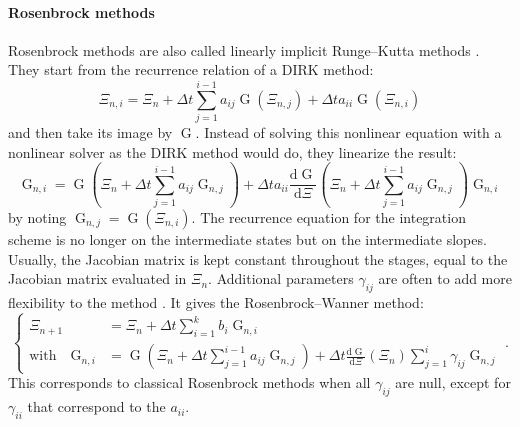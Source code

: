         \paragraph{Rosenbrock methods}
        Rosenbrock methods are also called linearly implicit Runge--Kutta methods \cite{Rosenbrock1963}.
        They start from the recurrence relation of a DIRK method:
        \begin{equation}
          \Xi_{n,i} = \Xi_n + \Delta t \sum_{j = 1}^{i-1} a_{ij} \operatorname{G}\left(\Xi_{n,j}\right) + \Delta t a_{ii} \operatorname{G}\left(\Xi_{n,i}\right)
        \end{equation}
        and then take its image by $\operatorname{G}$.
        Instead of solving this nonlinear equation with a nonlinear solver as the DIRK method would do, they linearize the result:
        \begin{equation}
          \operatorname{G}_{n,i} = \operatorname{G}\left(\Xi_n + \Delta t \sum_{j = 1}^{i-1} a_{ij} \operatorname{G}_{n,j}\right)
          + \Delta t a_{ii} \frac{\mathrm{d} \operatorname{G}}{\mathrm{d} \Xi}\left(\Xi_n + \Delta t \sum_{j = 1}^{i-1} a_{ij} \operatorname{G}_{n,j}\right) \operatorname{G}_{n,i}
        \end{equation}
        by noting $\operatorname{G}_{n,j} = \operatorname{G}\left(\Xi_{n,i}\right)$.
        The recurrence equation for the integration scheme is no longer on the intermediate states but on the intermediate slopes.
        Usually, the Jacobian matrix is kept constant throughout the stages, equal to the Jacobian matrix evaluated in $\Xi_n$.
        Additional parameters $\gamma_{ij}$ are often to add more flexibility to the method \cite{Wanner1977}.
        It gives the Rosenbrock--Wanner method:
        \begin{equation}
          \left\{\begin{aligned}
            \Xi_{n+1} &= \Xi_n + \Delta t \sum_{i = 1}^k b_i \operatorname{G}_{n,i} \\
            \textrm{with}\quad \operatorname{G}_{n,i} &=
              \operatorname{G}\left(\Xi_n + \Delta t \sum_{j = 1}^{i-1} a_{ij} \operatorname{G}_{n,j}\right)
              + \Delta t \frac{\mathrm{d} \operatorname{G}}{\mathrm{d} \Xi}\left(\Xi_n\right) \sum_{j = 1}^{i} \gamma_{ij} \operatorname{G}_{n,j}
          \end{aligned}\right. .
        \end{equation}
        This corresponds to classical Rosenbrock methods when all $\gamma_{ij}$ are null, except for $\gamma_{ii}$ that correspond to the $a_{ii}$.
